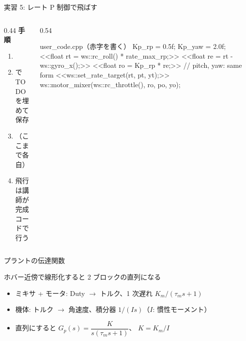 \begin{frame}[fragile]{実習 5: レート P 制御で飛ばす}
  \begin{columns}[T]
    \begin{column}{0.44\textwidth}
      {\footnotesize\textbf{\textcolor{sfblue}{手順}}}\par\vspace{-2pt}
      \footnotesize
      \begin{enumerate}\setlength{\itemsep}{0pt}
        \item {}
        \item {} で TODO を埋めて保存
        \item {}（ここまで各自）
        \item 飛行は講師が完成コードで行う
      \end{enumerate}
    \end{column}
    \begin{column}{0.54\textwidth}
      \begin{sflisting}[basicstyle=\ttfamily\scriptsize, moredelim={[is][\bfseries\color{sfred}]{<<}{>>}}]{user\_code.cpp（赤字を書く）}
Kp_rp = 0.5f; Kp_yaw = 2.0f;
<<float rt = ws::rc_roll() * rate_max_rp;>>
<<float re = rt - ws::gyro_x();>>
<<float ro = Kp_rp * re;>>
// pitch, yaw: same form
<<ws::set_rate_target(rt, pt, yt);>>
ws::motor_mixer(ws::rc_throttle(),
                ro, po, yo);
      \end{sflisting}
    \end{column}
  \end{columns}
\end{frame}

\begin{frame}{プラントの伝達関数}
  \begin{center}
    \vspace{-2mm}
  \end{center}

  \begin{exampleblock}{ホバー近傍で線形化すると 2 ブロックの直列になる}\footnotesize
    \begin{itemize}\setlength{\itemsep}{1pt}
      \item ミキサ + モータ: Duty $\to$ トルク、1 次遅れ $K_m/(\tau_m s+1)$
      \item 機体: トルク $\to$ 角速度、積分器 $1/(Is)$（$I$: 慣性モーメント）
      \item 直列にすると $G_p(s)=\dfrac{K}{s(\tau_m s+1)}$、 $K=K_m/I$
    \end{itemize}
  \end{exampleblock}
\end{frame}

